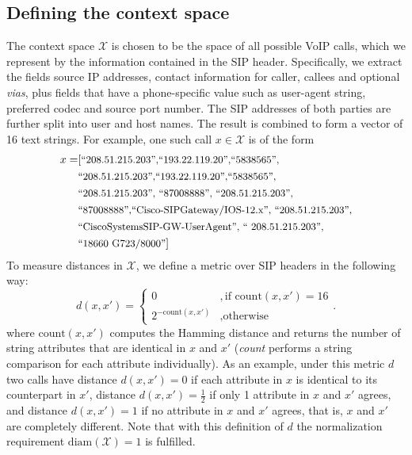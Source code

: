 \documentclass{llncs}
\begin{document}
\subsection{Defining the context space}
The context space $\mathcal X$ is chosen to be the space of all possible VoIP calls,
which we represent by the information contained in the SIP header. 
Specifically, we extract the fields source IP addresses, contact information for caller, 
callees and optional \emph{vias}, plus fields that have a phone-specific value such as 
user-agent string, preferred codec and source port number. The SIP addresses of both 
parties are further split into user and host names. The result is combined to form a 
vector of 16 text strings. 
For example, one such call $x\in \mathcal X$ is of the form
\begin{align*} 
x = &[\text{\small``208.51.215.203'',``193.22.119.20'',``5838565'',}\\
    &\text{\small``208.51.215.203'',``193.22.119.20'',``5838565'',}\\
    & \text{\small``208.51.215.203'',	``87008888'',	``208.51.215.203'',}\\
    & \text{\small``87008888'',``Cisco-SIPGateway/IOS-12.x'',	``208.51.215.203'',}\\
    & \text{\small``CiscoSystemsSIP-GW-UserAgent'', ``	208.51.215.203'',}\\
    & \text{\small``18660	G723/8000''}]
\end{align*}
To measure distances in $\mathcal X$, we define a metric over SIP headers in 
the following way:
\[
d(x,x')=\begin{cases}0 &, \text{if } \text{count}(x,x')=16 \\
2^{-\text{count}(x,x')} &, \text{otherwise} \end{cases}. 
\]
where $\text{count}(x,x')$ computes the Hamming distance and
returns the number of string attributes that are identical in $x$ and $x'$ 
({\em count} performs a string comparison for each attribute individually). 
As an example, under this metric $d$ two calls 
have distance $d(x,x')=0$ if each attribute in $x$ is identical to its counterpart in $x'$,
distance $d(x,x')=\frac{1}{2}$ if only 1 attribute in $x$ and $x'$ agrees, and distance
$d(x,x')=1$ if no attribute in $x$ and $x'$ agrees, that is, $x$ and $x'$ are 
completely different. Note that with this definition of $d$ the normalization
requirement $\mathrm{diam}(\mathcal X)=1$ is fulfilled.
\end{document}
